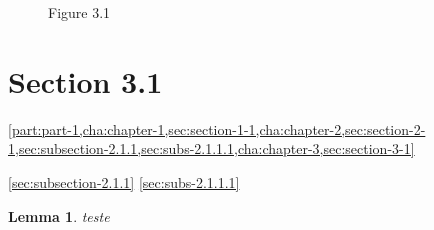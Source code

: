 \documentclass{book}
\newtheorem{lemma}{Lemma}
\begin{document}
\begin{figure}
  \centering

  \caption{Figure 3.1}
  \label{fig:figure-3-1}
\end{figure}

\section{Section 3.1}
\label{sec:section-3-1}

\cref{part:part-1,cha:chapter-1,sec:section-1-1,cha:chapter-2,sec:section-2-1,sec:subsection-2.1.1,sec:subs-2.1.1.1,cha:chapter-3,sec:section-3-1}

\cref{sec:subsection-2.1.1}
\cref{sec:subs-2.1.1.1}


\begin{lemma}
  teste
\end{lemma}

\makeatletter
\show\@currentcounter
\makeatother

\figurename

\tablename
\end{document}
